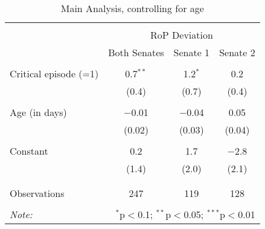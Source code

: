 
\begin{table}[!htbp] \centering 
  \caption{Main Analysis, controlling for age} 
  \label{rob_age2} 
\begin{tabular}{@{\extracolsep{5pt}}lccc} 
\\[-1.8ex]\hline 
\hline \\[-1.8ex] 
 & \multicolumn{3}{c}{RoP Deviation} \\ 
\cline{2-4} 
 & Both Senates & Senate 1 & Senate 2 \\ 
\hline \\[-1.8ex] 
 Critical episode (=1) & 0.7$^{**}$ & 1.2$^{*}$ & 0.2 \\ 
  & (0.4) & (0.7) & (0.4) \\ 
  & & & \\ 
 Age (in days) & $-$0.01 & $-$0.04 & 0.05 \\ 
  & (0.02) & (0.03) & (0.04) \\ 
  & & & \\ 
 Constant & 0.2 & 1.7 & $-$2.8 \\ 
  & (1.4) & (2.0) & (2.1) \\ 
  & & & \\ 
\hline \\[-1.8ex] 
Observations & 247 & 119 & 128 \\ 
\hline 
\hline \\[-1.8ex] 
\textit{Note:}  & \multicolumn{3}{r}{$^{*}$p$<$0.1; $^{**}$p$<$0.05; $^{***}$p$<$0.01} \\ 
\end{tabular} 
\end{table} 
